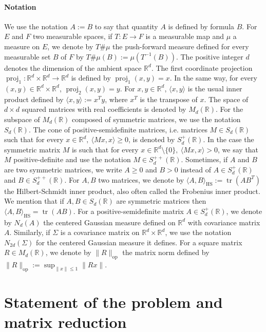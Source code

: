 \documentclass[]{article}
\DeclareMathOperator{\tr}{tr}
\DeclareMathOperator{\proj}{proj}
\DeclareMathOperator{\op}{op}
\DeclareMathOperator{\HS}{HS}
\numberwithin{equation}{section}
\theoremstyle{plain}
\begin{document}
\paragraph{Notation}
We use the notation $A:=B$ to say that quantity $A$ is defined by formula $B$. For $E$ and $F$ two measurable spaces, if $T : E  \rightarrow F$ is a measurable map and $\mu$ a measure on $E$, we denote by $T\#\mu$ the push-forward measure defined for every measurable set $B$ of $F$ by $T\#\mu(B) := \mu(T^{-1}(B))$. The positive integer $d$ denotes the dimension of the ambient space $\mathbb{R}^d$. The first coordinate projection $\proj_1: \mathbb{R}^d \times  \mathbb{R}^d \rightarrow \mathbb{R}^d$ is defined by $\proj_1(x,y) = x$. In the same way, for every $(x,y) \in \mathbb{R}^d \times \mathbb{R}^d$, $\proj_2(x,y) = y$. For $x,y \in \mathbb{R}^d$, $\langle x, y \rangle$ is the usual inner product defined by $\langle x, y \rangle := x^Ty$, where $x^T$ is the transpose of $x$. The space of $d\times d$ squared matrices with real coefficients is denoted by $M_d(\mathbb{R})$. For the subspace of $M_d(\mathbb{R})$ composed of symmetric matrices, we use the notation $S_d(\mathbb{R})$. The cone of positive-semidefinite matrices, i.e. matrices $M \in S_{d}(\mathbb{R})$ such that for every $x \in \mathbb{R}^d,~ \langle M x, x \rangle \geq 0$, is denoted by $S_{d}^{+}(\mathbb{R})$. In the case the symmetric matrix $M$ is such that for every $x \in \mathbb{R}^d \setminus \{0\},~ \langle Mx,x\rangle >0$, we say that $M$ positive-definite and use the notation $M \in S_{d}^{++}(\mathbb{R})$. Sometimes, if $A$ and $B$ are two symmetric matrices, we write $A \geq 0$ and $B > 0$ instead of $A \in S_d^{+}(\mathbb{R})$ and $B \in S_d^{++}(\mathbb{R})$. For $A, B$ two matrices, we denote by $\langle A, B \rangle_{\HS} := \tr(A B^T)$ the Hilbert-Schmidt inner product, also often called the Frobenius inner product. We mention that if $A, B \in S_d(\mathbb{R})$ are symmetric matrices then $\langle A, B \rangle_{\HS} = \tr(AB)$. For a positive-semidefinite matrix $A \in S_d^{+}(\mathbb{R})$, we denote by $N_d(A)$ the centered Gaussian measure defined on $\mathbb{R}^d$ with covariance matrix $A$. Similarly, if $\Sigma$ is a covariance matrix on $\mathbb{R}^d \times \mathbb{R}^d$, we use the notation $N_{2d}(\Sigma)$ for the centered Gaussian measure it defines. For a square matrix $R\in M_d(\mathbb{R})$, we denote by $\|R\|_{\op}$ the matrix norm defined by $\|R\|_{\op} := \sup_{\|x\| \leq 1} \|Rx\|$.




\section{Statement of the problem and matrix reduction}\label{sec:statement_reduction}
\end{document}
